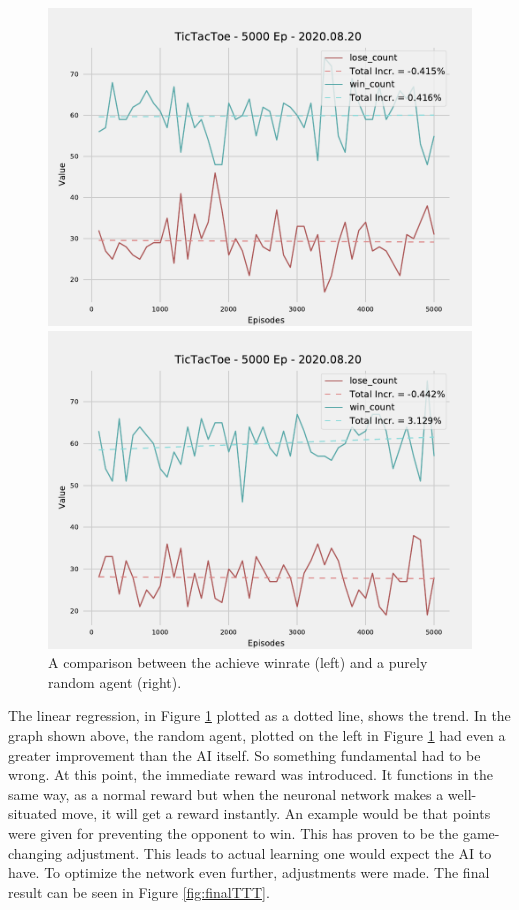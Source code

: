\documentclass[12pt]{article}
\begin{document}
\begin{figure}[ht]
    \centering
    \begin{minipage}{0.5\textwidth}
        \centering
        \includegraphics[width=0.9\linewidth]{pictures/TicTacToe - 5000 Ep - 2020.08.20 (o).pdf}
    \end{minipage}%
    \begin{minipage}{0.5\textwidth}
        \centering
        \includegraphics[width=0.9\linewidth]{pictures/TicTacToe - 5000 Ep - 2020.08.20 (r).pdf}
    \end{minipage}
    \caption{A comparison between the achieve winrate (left) and a purely random agent (right).}
    \label{fig:both}
\end{figure}
The linear regression, in Figure \ref{fig:both} plotted as a dotted line, shows the trend. In the graph shown above, the random agent, plotted on the left in Figure \ref{fig:both} had even a greater improvement than the \gls{AI} itself. So something fundamental had to be wrong. At this point, the immediate reward was introduced. It functions in the same way, as a normal reward but when the \gls{neuronal network} makes a well-situated move, it will get a reward instantly. An example would be that points were given for preventing the opponent to win. This has proven to be the game-changing adjustment. This leads to actual learning one would expect the \gls{AI} to have. To optimize the network even further, adjustments were made. The final result can be seen in Figure \ref{fig:finalTTT}. \\
\end{document}
